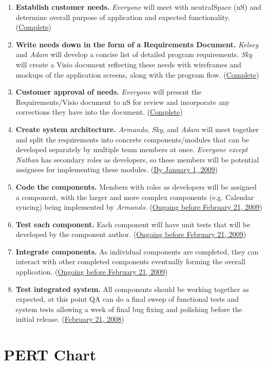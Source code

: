 \documentclass[11pt]{article}
\begin{document}
\begin{enumerate}
 \item \textbf{Establish customer needs.} \textit{Everyone} will meet with neutralSpace (nS) and determine overall purpose of application and expected functionality. (\underline{Complete})
 \item \textbf{Write needs down in the form of a Requirements Document.} \textit{Kelsey} and \textit{Adam} will develop a concise list of detailed program requirements. \textit{Sky} will create a Visio document reflecting these needs with wireframes and mockups of the application screens, along with the program flow. (\underline{Complete})
 \item \textbf{Customer approval of needs.} \textit{Everyone} will present the Requirements/Visio document to nS for review and incorporate any corrections they have into the document. (\underline{Complete})
 \item \textbf{Create system architecture.} \textit{Armando}, \textit{Sky}, and \textit{Adam} will meet together and split the requirements into concrete components/modules that can be developed separately by multiple team members at once. \textit{Everyone except Nathan} has secondary roles as developers, so these members will be potential assignees for implementing these modules. (\underline{By January 1, 2009})
 \item \textbf{Code the components.} Members with roles as developers will be assigned a component, with the larger and more complex components (e.g. Calendar syncing) being implemented by \textit{Armando}. (\underline{Ongoing before February 21, 2009})
 \item \textbf{Test each component.} Each component will have unit tests that will be developed by the component author. (\underline{Ongoing before February 21, 2009})
 \item \textbf{Integrate components.} As individual components are completed, they can interact with other completed components eventually forming the overall application. (\underline{Ongoing before February 21, 2009})
 \item \textbf{Test integrated system.} All components should be working together as expected, at this point QA can do a final sweep of functional tests and system tests allowing a week of final bug fixing and polishing before the initial release. (\underline{February 21, 2008})
\end{enumerate}


\section{PERT Chart}
\end{document}

